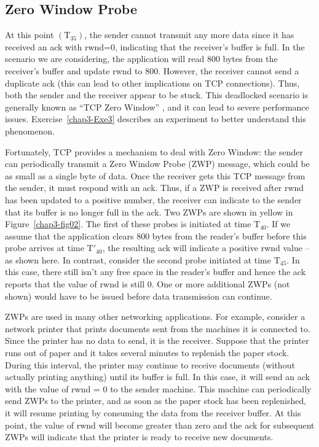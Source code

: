 \begin{multicols}{2}
\section{Zero Window Probe}

At this point $({\text{T}}_{35})$, the sender cannot transmit any more data since it has received an ack with rwnd=0, indicating that the receiver’s buffer is full. In the scenario we are considering, the application will read 800 bytes from the receiver’s buffer and update rwnd to 800. However, the receiver cannot send a duplicate ack (this can lead to other implications on TCP connections). Thus, both the sender and the receiver appear to be stuck. This deadlocked scenario is generally known as “TCP Zero Window” \cite{art3-key10}\cite{art3-key11}, and it can lead to severe performance issues. Exercise~\ref{chap3-Exe3} describes an experiment to better understand this phenomenon.

Fortunately, TCP provides a mechanism to deal with Zero Window: the sender can periodically transmit a Zero Window Probe (ZWP) message, which could be as small as a single byte of data. Once the receiver gets this TCP message from the sender, it must respond with an ack. Thus, if a ZWP is received after rwnd has been updated to a positive number, the receiver can indicate to the sender that its buffer is no longer full in the ack. Two ZWPs are shown in yellow in Figure~\ref{chap3-fig02}. The first of these probes is initiated at time ${\text{T}}_{40}$. If we assume that the application clears 800 bytes from the reader’s buffer before this probe arrives at time ${\text{T}}\prime_{\!\!40}$, the resulting ack will indicate a positive rwnd value – as shown here. In contrast, consider the second probe initiated at time ${\text{T}}_{45}$. In this case, there still isn’t any free space in the reader’s buffer and hence the ack reports that the value of rwnd is still 0. One or more additional ZWPs (not shown) would have to be issued before data transmission can continue.

ZWPs are used in many other networking applications. For example, consider a network printer that prints documents sent from the machines it is connected to. Since the printer has no data to send, it is the receiver. Suppose that the printer runs out of paper and it takes several minutes to replenish the paper stock. During this interval, the printer may continue to receive documents (without actually printing anything) until its buffer is full. In this case, it will send an ack with the value of rwnd = 0 to the sender machine. This machine can periodically send ZWPs to the printer, and as soon as the paper stock has been replenished, it will resume printing by consuming the data from the receiver buffer. At this point, the value of rwnd will become greater than zero and the ack for subsequent ZWPs will indicate that the printer is ready to receive new documents.


\end{multicols}
